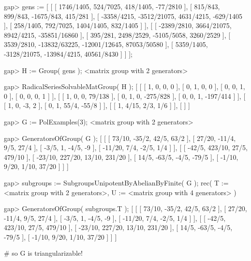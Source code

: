 \beginexample
gap> gens := 
[ [ [ 1746/1405, 524/7025, 418/1405, -77/2810 ], 
    [ 815/843, 899/843, -1675/843, 415/281 ],
    [ -3358/4215, -3512/21075, 4631/4215, -629/1405 ],
    [ 258/1405, 792/7025, 1404/1405, 832/1405 ] ],
  [ [ -2389/2810, 3664/21075, 8942/4215, -35851/16860 ],
    [ 395/281, 2498/2529, -5105/5058, 3260/2529 ],
    [ 3539/2810, -13832/63225, -12001/12645, 87053/50580 ],
    [ 5359/1405, -3128/21075, -13984/4215, 40561/8430 ] ] ];

gap> H := Group( gens );
<matrix group with 2 generators>
     
gap> RadicalSeriesSolvableMatGroup( H );
[ [ [ 1, 0, 0, 0 ], [ 0, 1, 0, 0 ], [ 0, 0, 1, 0 ], [ 0, 0, 0, 1 ] ],
  [ [ 1, 0, 0, 79/138 ], [ 0, 1, 0, -275/828 ], [ 0, 0, 1, -197/414 ] ],
  [ [ 1, 0, -3, 2 ], [ 0, 1, 55/4, -55/8 ] ], 
  [ [ 1, 4/15, 2/3, 1/6 ] ], 
  [  ] ]
\endexample

\beginexample
gap> G := PolExamples(3);
<matrix group with 2 generators>

gap> GeneratorsOfGroup( G );
[ [ [ 73/10, -35/2, 42/5, 63/2 ], 
    [ 27/20, -11/4, 9/5, 27/4 ],
    [ -3/5, 1, -4/5, -9 ], 
    [ -11/20, 7/4, -2/5, 1/4 ] ],
  [ [ -42/5, 423/10, 27/5, 479/10 ], 
    [ -23/10, 227/20, 13/10, 231/20 ],
    [ 14/5, -63/5, -4/5, -79/5 ], 
    [ -1/10, 9/20, 1/10, 37/20 ] ] ]

gap> subgroups := SubgroupsUnipotentByAbelianByFinite( G );
rec( T := <matrix group with 2 generators>,
  U := <matrix group with 4 generators> )

gap> GeneratorsOfGroup( subgroups.T );
[ [ [ 73/10, -35/2, 42/5, 63/2 ], 
    [ 27/20, -11/4, 9/5, 27/4 ],
    [ -3/5, 1, -4/5, -9 ], 
    [ -11/20, 7/4, -2/5, 1/4 ] ],
  [ [ -42/5, 423/10, 27/5, 479/10 ], 
    [ -23/10, 227/20, 13/10, 231/20 ],
    [ 14/5, -63/5, -4/5, -79/5 ], 
    [ -1/10, 9/20, 1/10, 37/20 ] ] ]

# so G is triangularizable!
\endexample























